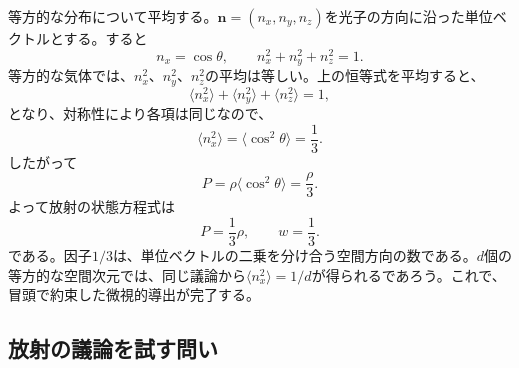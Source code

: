 等方的な分布について平均する。\(\mathbf n=(n_x,n_y,n_z)\)を光子の方向に沿った単位ベクトルとする。すると
\begin{equation}
n_x=\cos\theta,
\qquad
n_x^2+n_y^2+n_z^2=1.
\end{equation}
等方的な気体では、\(n_x^2\)、\(n_y^2\)、\(n_z^2\)の平均は等しい。上の恒等式を平均すると、
\begin{equation}
\langle n_x^2\rangle+\langle n_y^2\rangle+\langle n_z^2\rangle=1,
\end{equation}
となり、対称性により各項は同じなので、
\begin{equation}
\langle n_x^2\rangle=\langle \cos^2\theta\rangle=\frac13.
\end{equation}
したがって
\begin{equation}
P=\rho\langle \cos^2\theta\rangle=\frac{\rho}{3}.
\end{equation}
よって放射の状態方程式は
\begin{equation}
P=\frac13\rho,
\qquad
w=\frac13.
\end{equation}
である。因子\(1/3\)は、単位ベクトルの二乗を分け合う空間方向の数である。\(d\)個の等方的な空間次元では、同じ議論から\(\langle n_x^2\rangle=1/d\)が得られるであろう。これで、冒頭で約束した微視的導出が完了する。

\subsection{放射の議論を試す問い}

\begin{classroomqa}
\end{classroomqa}

\begin{classroomqa}
\end{classroomqa}

